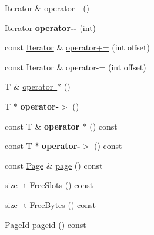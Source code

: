 \begin{DoxyCompactItemize}
\mbox{\hyperlink{class_buffer_manager_1_1_iterator}{Iterator}} \& \mbox{\hyperlink{class_buffer_manager_1_1_iterator_ab9959f549dcfa3f6daa47677552b673d}{operator-\/-\/}} ()
\item 
\mbox{\label{class_buffer_manager_1_1_iterator_a3e4dd078bdb98410c660e0db8b04e6fc}} 
\mbox{\hyperlink{class_buffer_manager_1_1_iterator}{Iterator}} {\bfseries operator-\/-\/} (int)
\item 
const \mbox{\hyperlink{class_buffer_manager_1_1_iterator}{Iterator}} \& \mbox{\hyperlink{class_buffer_manager_1_1_iterator_aced12f95569a91d98a83bf635d671e25}{operator+=}} (int offset)
\item 
const \mbox{\hyperlink{class_buffer_manager_1_1_iterator}{Iterator}} \& \mbox{\hyperlink{class_buffer_manager_1_1_iterator_a2a24e019d3a2934f3cd275b8a2436e59}{operator-\/=}} (int offset)
\item 
T \& \mbox{\hyperlink{class_buffer_manager_1_1_iterator_a633c54abf71a334ff179cc359e655d5d}{operator $\ast$}} ()
\item 
\mbox{\label{class_buffer_manager_1_1_iterator_a20bdfb7f62a888b895bdc47e86d35d13}} 
T $\ast$ {\bfseries operator-\/$>$} ()
\item 
\mbox{\label{class_buffer_manager_1_1_iterator_a41bdc119f5fefb4651be23cb85c18ae2}} 
const T \& {\bfseries operator $\ast$} () const
\item 
\mbox{\label{class_buffer_manager_1_1_iterator_adebf0c44caecfa0274167cdd084a26a4}} 
const T $\ast$ {\bfseries operator-\/$>$} () const
\item 
const \mbox{\hyperlink{struct_page}{Page}} \& \mbox{\hyperlink{class_buffer_manager_1_1_iterator_a5a17d8377bc10f437e29b058c0376b15}{page}} () const
\item 
size\+\_\+t \mbox{\hyperlink{class_buffer_manager_1_1_iterator_a436c0bafa40d441a59c0fb0e3aeb62cc}{Free\+Slots}} () const
\item 
size\+\_\+t \mbox{\hyperlink{class_buffer_manager_1_1_iterator_a3a53f35f35074aa2079dead6cc606a5b}{Free\+Bytes}} () const
\item 
\mbox{\hyperlink{struct_generic_i_o_id}{Page\+Id}} \mbox{\hyperlink{class_buffer_manager_1_1_iterator_a7a57002c7f8daa714cf9e19e34874fca}{pageid}} () const

\end{DoxyCompactItemize}
